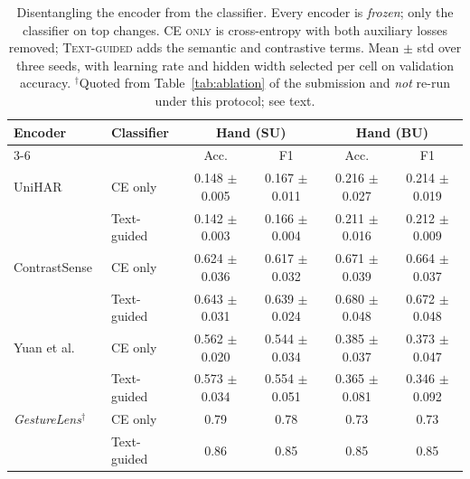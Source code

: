 \begin{table}[t]
\centering
\small
\begin{tabular}{llcccc}
\toprule
Encoder & Classifier & \multicolumn{2}{c}{Hand (SU)} & \multicolumn{2}{c}{Hand (BU)} \\
\cmidrule(lr){3-6}
 & & Acc. & F1 & Acc. & F1 \\
\midrule
UniHAR~\cite{xu2023practically} & CE only & 0.148 $\pm$ 0.005 & 0.167 $\pm$ 0.011 & 0.216 $\pm$ 0.027 & 0.214 $\pm$ 0.019 \\
 & Text-guided & 0.142 $\pm$ 0.003 & 0.166 $\pm$ 0.004 & 0.211 $\pm$ 0.016 & 0.212 $\pm$ 0.009 \\
\addlinespace
ContrastSense~\cite{dai2024contrastsense} & CE only & 0.624 $\pm$ 0.036 & 0.617 $\pm$ 0.032 & 0.671 $\pm$ 0.039 & 0.664 $\pm$ 0.037 \\
 & Text-guided & 0.643 $\pm$ 0.031 & 0.639 $\pm$ 0.024 & 0.680 $\pm$ 0.048 & 0.672 $\pm$ 0.048 \\
\addlinespace
Yuan et al.~\cite{yuan2024self} & CE only & 0.562 $\pm$ 0.020 & 0.544 $\pm$ 0.034 & 0.385 $\pm$ 0.037 & 0.373 $\pm$ 0.047 \\
 & Text-guided & 0.573 $\pm$ 0.034 & 0.554 $\pm$ 0.051 & 0.365 $\pm$ 0.081 & 0.346 $\pm$ 0.092 \\
\addlinespace
\midrule
\textit{GestureLens}$^\dagger$ & CE only & 0.79 & 0.78 & 0.73 & 0.73 \\
 & Text-guided & 0.86 & 0.85 & 0.85 & 0.85 \\
\bottomrule
\end{tabular}
\caption{Disentangling the encoder from the classifier. Every encoder is \emph{frozen}; only the classifier on top changes. \textsc{CE only} is cross-entropy with both auxiliary losses removed; \textsc{Text-guided} adds the semantic and contrastive terms. Mean $\pm$ std over three seeds, with learning rate and hidden width selected per cell on validation accuracy. $^\dagger$Quoted from Table~\ref{tab:ablation} of the submission and \emph{not} re-run under this protocol; see text.}
\label{tab:tier0}
\end{table}


